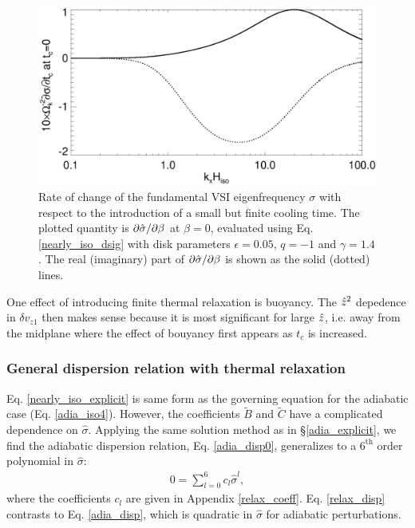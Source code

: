 \begin{figure}
  \includegraphics[width=\linewidth]{figures/domegadbeta}
  \caption{Rate of change of the fundamental VSI eigenfrequency
    $\sigma$ with respect to the introduction of a small but finite
    cooling time. The plotted quantity is $\partial\hat{\sigma}/\partial\beta$ at $\beta=0$, evaluated using
    Eq. \ref{nearly_iso_dsig} with 
    disk parameters $\epsilon=0.05$, $q=-1$ and $\gamma=1.4$. The real
    (imaginary) part of $\partial\hat{\sigma}/\partial\beta$ is shown as the solid
    (dotted) lines. 
    \label{domegadbeta}}  
\end{figure}   

One effect of introducing finite thermal relaxation is buoyancy. %
The $\hat{z}^2$ depedence in $\delta v_{z1}$ then makes sense because it
is most significant for large $\hat{z}$, i.e. away from the midplane
where the effect of bouyancy first appears as $t_c$ is increased. 

\subsubsection{General dispersion relation with thermal relaxation}\label{disp_relax}
Eq. \ref{nearly_iso_explicit} is same form
as the governing equation for the adiabatic case
(Eq. \ref{adia_iso4}). However, the coefficients $\widetilde{B}$ and $\widetilde{C}$
have a complicated dependence on $\hat{\sigma}$. 
Applying the same solution method as in \S\ref{adia_explicit}, we 
find the adiabatic dispersion relation,
Eq. \ref{adia_disp0}, generalizes to a $6^\mathrm{th}$ order
polynomial in $\hat{\sigma}$:
\begin{align}
  0 = \sum_{l=0}^{6}c_l\hat{\sigma}^l,\label{relax_disp}
\end{align}
where the coefficients $c_l$ are given in Appendix \ref{relax_coeff}.
Eq. \ref{relax_disp} contrasts to Eq. \ref{adia_disp}, which is
quadratic in $\hat{\sigma}$ for adiabatic perturbations. 

